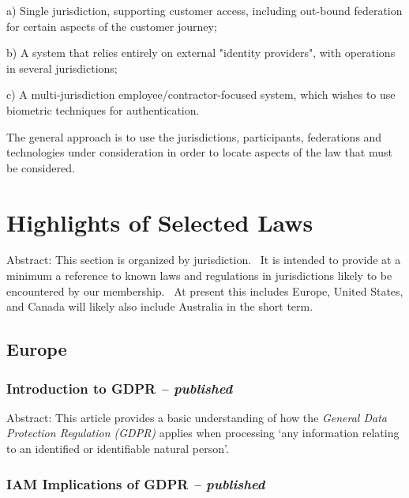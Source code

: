 a) Single jurisdiction, supporting customer access, including out-bound
federation for certain aspects of the customer journey;

b) A system that relies entirely on external "identity providers", with
operations in several jurisdictions;

c) A multi-jurisdiction employee/contractor-focused system, which wishes
to use biometric techniques for authentication.

The general approach is to use the jurisdictions, participants,
federations and technologies under consideration in order to locate
aspects of the law that must be considered.

\hypertarget{highlights-of-selected-laws}{%
\section{Highlights of Selected
Laws}\label{highlights-of-selected-laws}}

Abstract: This section is organized by jurisdiction.~ It is intended to
provide at a minimum a reference to known laws and regulations in
jurisdictions likely to be encountered by our membership.~ At present
this includes Europe, United States, and Canada will likely also include
Australia in the short term.

\hypertarget{europe}{%
\subsection{Europe}\label{europe}}

\hypertarget{introduction-to-gdpr-published}{%
\subsubsection{\texorpdfstring{Introduction to GDPR \emph{--
published}}{Introduction to GDPR -- published}}\label{introduction-to-gdpr-published}}

Abstract: This article provides a basic understanding of how the
\emph{General Data Protection Regulation (GDPR)} applies when processing
`any information relating to an identified or identifiable natural
person'.

\hypertarget{iam-implications-of-gdpr-published}{%
\subsubsection{\texorpdfstring{IAM Implications of GDPR \emph{--
published}}{IAM Implications of GDPR -- published}}\label{iam-implications-of-gdpr-published}}

